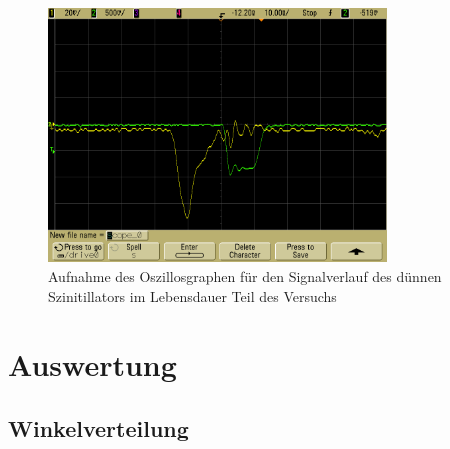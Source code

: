 \documentclass{article}
\begin{document}
\begin{figure}[H]
    \centering
    \includegraphics[width=0.8\textwidth]{figures/Zeiteinstellung2.png}
    \caption{Aufnahme des Oszillosgraphen für den Signalverlauf des dünnen Szinitillators im Lebensdauer Teil des Versuchs}
    \label{fig:SignalLebensdauer}
\end{figure}


\section{Auswertung}

\subsection{Winkelverteilung}
\end{document}

